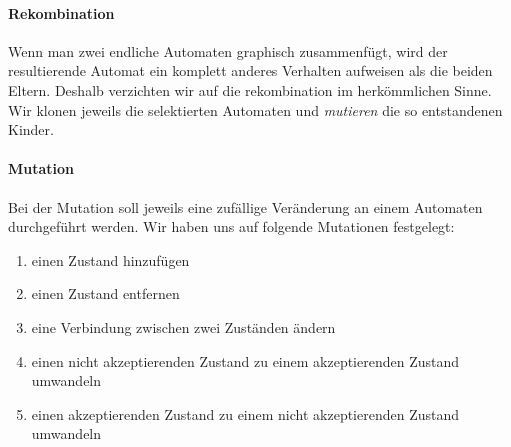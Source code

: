 \paragraph{Rekombination}
Wenn man zwei endliche Automaten graphisch zusammenfügt, wird der resultierende Automat ein komplett anderes Verhalten aufweisen als die beiden Eltern. Deshalb verzichten wir auf die rekombination im herkömmlichen Sinne. Wir klonen jeweils die selektierten Automaten und \textit{mutieren} die so entstandenen Kinder.

\paragraph{Mutation}
Bei der Mutation soll jeweils eine zufällige Veränderung an einem Automaten durchgeführt werden. Wir haben uns auf folgende Mutationen festgelegt:
\begin{enumerate}
	\item einen Zustand hinzufügen
	\item einen Zustand entfernen
	\item eine Verbindung zwischen zwei Zuständen ändern
	\item einen nicht akzeptierenden Zustand zu einem akzeptierenden Zustand umwandeln
	\item einen akzeptierenden Zustand zu einem nicht akzeptierenden Zustand umwandeln
\end{enumerate}